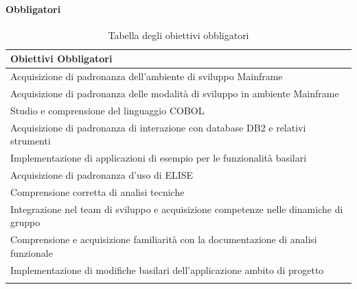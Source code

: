 	\paragraph{Obbligatori}

		\begin{center}
		  \bgroup
		  \def\arraystretch{1.4}
		   \setlength\arrayrulewidth{0.6pt}
		   \begin{longtable}{ | p{11cm} |} \hline
		    \cellcolor[gray]{0.9} \textbf{Obiettivi Obbligatori} \\ \hline

			 Acquisizione di padronanza dell'ambiente di sviluppo Mainframe  \\ \hline
			 Acquisizione di padronanza delle modalità di sviluppo in ambiente Mainframe \\ \hline
			 Studio e comprensione del linguaggio COBOL\glossario \\ \hline
			 Acquisizione di padronanza di interazione con database DB2 e relativi strumenti \\ \hline
			 Implementazione di applicazioni di esempio per le funzionalità basilari \\ \hline
			 Acquisizione di padronanza d'uso di ELISE \\ \hline
			 Comprensione corretta di analisi tecniche \\ \hline
			 Integrazione nel team di sviluppo e acquisizione competenze nelle dinamiche di gruppo \\ \hline
			 Comprensione e acquisizione familiarità con la documentazione di analisi funzionale \\ \hline
			 Implementazione di modifiche basilari dell'applicazione ambito di progetto \\ \hline
			
			\caption{Tabella degli obiettivi obbligatori}
			
		    \end{longtable}
		  \egroup
		\end{center}
		
